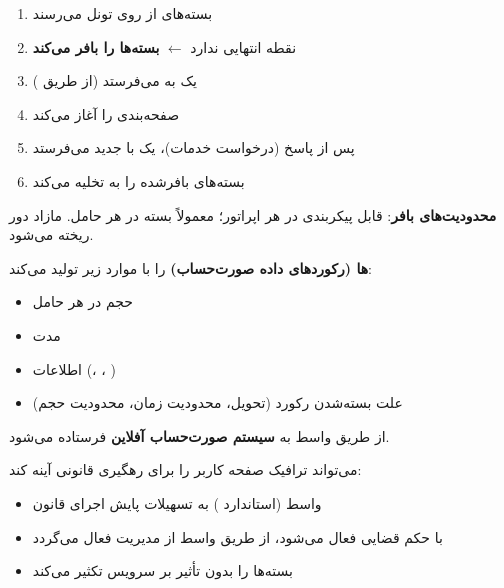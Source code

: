 \begin{enumerate}
\def\labelenumi{\arabic{enumi}.}
\tightlist
\item
  بسته‌های  از  روی تونل  می‌رسند
\item
   نقطه انتهایی  ندارد \ensuremath{\leftarrow} \textbf{بسته‌ها را بافر می‌کند}
\item
   یک  به  می‌فرستد (از طریق )
\item
   صفحه‌بندی را آغاز می‌کند
\item
  پس از پاسخ  (درخواست خدمات)،  یک  با  جدید  می‌فرستد
\item
   بسته‌های بافر‌شده را به  تخلیه می‌کند
\end{enumerate}

\textbf{محدودیت‌های بافر}: قابل پیکربندی در هر اپراتور؛ معمولاً  بسته در هر حامل. مازاد دور ریخته می‌شود.


 \textbf{ها (رکوردهای داده صورت‌حساب)} را با موارد زیر تولید می‌کند:

\begin{itemize}
\tightlist
\item
  حجم  در هر حامل
\item
  مدت
\item
  اطلاعات  (، ، )
\item
  علت بسته‌شدن رکورد (تحویل، محدودیت زمان، محدودیت حجم)
\end{itemize}

از طریق واسط  به \textbf{سیستم صورت‌حساب آفلاین } فرستاده می‌شود.


 می‌تواند ترافیک صفحه کاربر را برای رهگیری قانونی  آینه کند:

\begin{itemize}
\tightlist
\item
  واسط  (استاندارد ) به تسهیلات پایش اجرای قانون 
\item
  با حکم قضایی فعال می‌شود، از طریق واسط  از مدیریت  فعال می‌گردد
\item
  بسته‌ها را بدون تأثیر بر سرویس  تکثیر می‌کند
\end{itemize}

